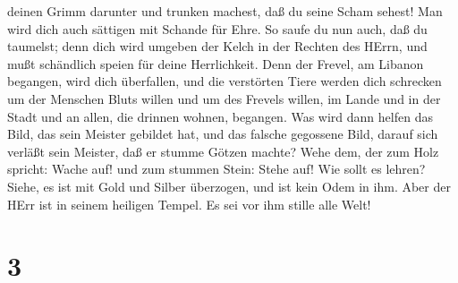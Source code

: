 deinen Grimm darunter und trunken machest, daß du seine Scham sehest!
 Man wird dich auch sättigen mit Schande für Ehre. So saufe
du nun auch, daß du taumelst; denn dich wird umgeben der Kelch in der
Rechten des HErrn, und mußt schändlich speien für deine Herrlichkeit.
 Denn der Frevel, am Libanon begangen, wird dich
überfallen, und die verstörten Tiere werden dich schrecken um der
Menschen Bluts willen und um des Frevels willen, im Lande und in der
Stadt und an allen, die drinnen wohnen, begangen.  Was wird
dann helfen das Bild, das sein Meister gebildet hat, und das falsche
gegossene Bild, darauf sich verläßt sein Meister, daß er stumme Götzen
machte?  Wehe dem, der zum Holz spricht: Wache auf! und zum
stummen Stein: Stehe auf! Wie sollt es lehren? Siehe, es ist mit Gold
und Silber überzogen, und ist kein Odem in ihm.  Aber der
HErr ist in seinem heiligen Tempel. Es sei vor ihm stille alle Welt!

\hypertarget{section-2}{%
\section{3}\label{section-2}}

